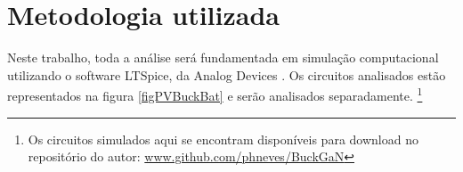 \chapter{Metodologia utilizada}
\label{chapterMetodologia}
\par Neste trabalho, toda a análise será fundamentada em simulação computacional utilizando o software LTSpice, da Analog Devices \cite{ltspice}. Os circuitos analisados estão representados na figura \ref{figPVBuckBat} e serão analisados separadamente. \footnote{Os circuitos simulados aqui se encontram disponíveis para download no repositório do autor: \url{www.github.com/phneves/BuckGaN}}


